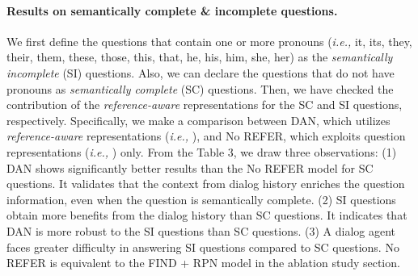 \documentclass[11pt,a4paper]{article}
\begin{document}
\paragraph{Results on semantically complete \& incomplete questions.} We first define the questions that contain one or more pronouns ({\it i.e.,} it, its, they, their, them, these, those, this, that, he, his, him, she, her) as the {\it semantically incomplete} (SI) questions. Also, we can declare the questions that do not have pronouns as {\it semantically complete} (SC) questions. Then, we have checked the contribution of the {\it{reference-aware}} representations for the SC and SI questions, respectively. Specifically, we make a comparison between DAN, which utilizes {\it reference-aware} representations ({\it i.e.,} ), and No REFER, which exploits question representations ({\it i.e.,} ) only. From the Table 3, we draw three observations: (1) DAN shows significantly better results than the No REFER model for SC questions. It validates that the context from dialog history enriches the question information, even when the question is semantically complete. (2) SI questions obtain more benefits from the dialog history than SC questions. It indicates that DAN is more robust to the SI questions than SC questions. (3) A dialog agent faces greater difficulty in answering SI questions compared to SC questions. No REFER is equivalent to the FIND + RPN model in the ablation study section. 
\begin{table}
\centering
{}
\caption{VisDial v1.0 validation performance on the semantically complete (SC) and incomplete (SI) questions. We observe that SI questions obtain more benefits from the dialog history than SC questions.}
\label{tab:t4}
\end{table}
\end{document}
